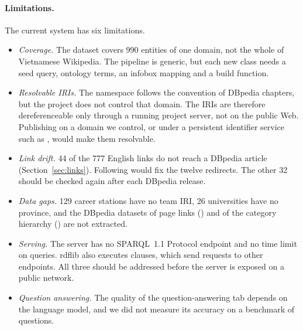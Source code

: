 \paragraph{Limitations.} The current system has six limitations.
\begin{itemize}
  \item \emph{Coverage.} The dataset covers 990 entities of one domain, not the
        whole of Vietnamese Wikipedia. The pipeline is generic, but each new
        class needs a seed query, ontology terms, an infobox mapping and a
        build function.
  \item \emph{Resolvable IRIs.} The  namespace follows the
        convention of DBpedia chapters, but the project does not control that
        domain. The IRIs are therefore dereferenceable only through a running
        project server, not on the public Web. Publishing on a domain we
        control, or under a persistent identifier service such as
        , would make them resolvable.
  \item \emph{Link drift.} 44 of the 777 English links do not reach a DBpedia
        article (Section~\ref{sec:links}). Following
         would fix the twelve redirects. The
        other 32 should be checked again after each DBpedia release.
  \item \emph{Data gaps.} 129 career stations have no team IRI, 26
        universities have no province, and the DBpedia datasets of page links
        () and of the category hierarchy
        () are not extracted.
  \item \emph{Serving.} The server has no SPARQL~1.1 Protocol endpoint and no
        time limit on queries. rdflib also executes  clauses,
        which send requests to other endpoints. All three should be
        addressed before the server is exposed on a public network.
  \item \emph{Question answering.} The quality of the question-answering tab
        depends on the language model, and we did not measure its accuracy
        on a benchmark of questions.
\end{itemize}
